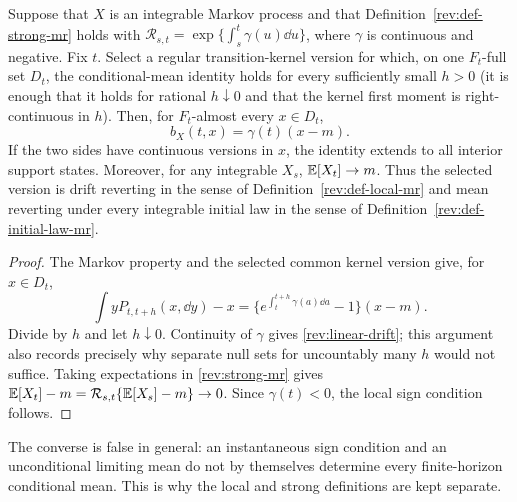 \begin{proposition}
\label{rev:prop-strong-local}
Suppose that $X$ is an integrable Markov process and that
Definition~\ref{rev:def-strong-mr} holds with
$\mathcal R_{s,t}=\exp\{\int_s^t\gamma(u)\dd u\}$, where $\gamma$ is continuous and
negative.  Fix $t$.  Select a regular transition-kernel version for which,
on one $F_t$-full set $D_t$, the conditional-mean identity holds for every
sufficiently small $h>0$ (it is enough that it holds for rational $h\downarrow0$
and that the kernel first moment is right-continuous in $h$).  Then, for
$F_t$-almost every $x\in D_t$,
\begin{equation}
b_X(t,x)=\gamma(t)(x-m).
\label{rev:linear-drift}
\end{equation}
If the two sides have continuous versions in $x$, the identity extends to all
interior support states.  Moreover, for any integrable $X_s$,
  $\mathbb E[X_t]\to m$.  Thus the selected version is drift reverting in the sense of
  Definition~\ref{rev:def-local-mr} and mean reverting under every integrable
  initial law in the sense of Definition~\ref{rev:def-initial-law-mr}.
\end{proposition}

\begin{proof}
The Markov property and the selected common kernel version give, for
$x\in D_t$,
\[
 \int yP_{t,t+h}(x,\dd y)-x
 =\{e^{\int_t^{t+h}\gamma(a)\dd a}-1\}(x-m).
\]
Divide by $h$ and let $h\downarrow0$.  Continuity of $\gamma$ gives
\eqref{rev:linear-drift}; this argument also records precisely why separate
null sets for uncountably many $h$ would not suffice.  Taking expectations in
\eqref{rev:strong-mr} gives
$\mathbb E[X_t]-m=\mathcal R_{s,t}\{\mathbb E[X_s]-m\}\to0$.
Since $\gamma(t)<0$, the local sign condition follows.
\end{proof}

\begin{remark}
The converse is false in general: an instantaneous sign condition and an
unconditional limiting mean do not by themselves determine every finite-horizon
conditional mean.  This is why the local and strong definitions are kept
separate.
\end{remark}

